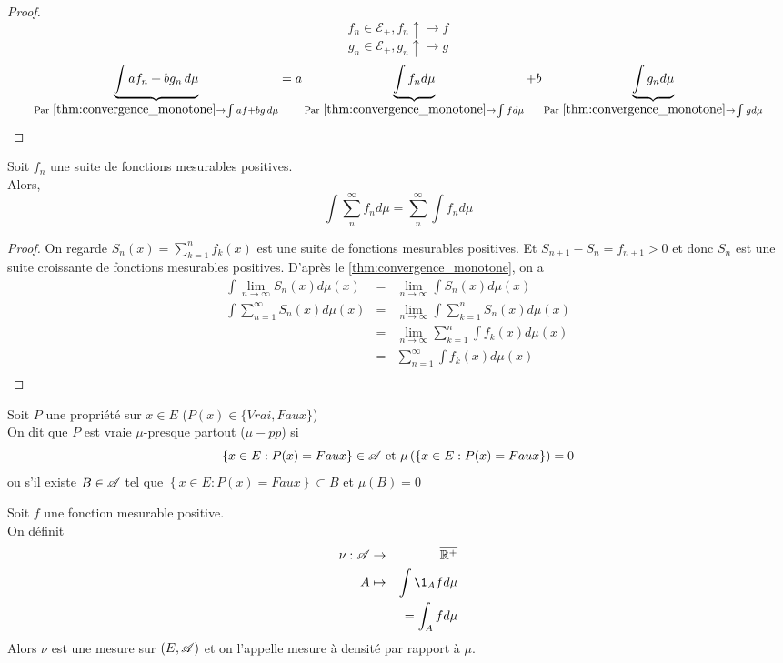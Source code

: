 \begin{proof}
	$$f_n \in \mathcal{E}_+, f_n \uparrow \to f$$
	$$ g_n \in \mathcal{E}_+, g_n \uparrow \to g$$
	$$ \underbrace{\int a f_n + b g_n \,d\mu}_{\text{Par } \ref{thm:convergence_monotone} \to \int a f + b g\,d\mu}
		= a \underbrace{\int f_n d\mu}_{ \text{Par } \ref{thm:convergence_monotone} \to \int f d\mu}
		+ b \underbrace{\int g_n d\mu}_{ \text{Par } \ref{thm:convergence_monotone} \to \int g d\mu} $$
\end{proof}



\begin{prop} 
	Soit $f_n$ une suite de fonctions mesurables positives.\\
	Alors,
	$$ \int \sum\limits_n^{\infty} f_n d\mu = \sum\limits_n^{\infty} \int f_n d\mu $$
\end{prop}

\begin{proof}
	On regarde $S_n(x) = \sum\limits_{k=1}^n f_k(x)$ est une suite de fonctions mesurables positives.
	Et $S_{n+1} - S_n = f_{n+1} > 0 $ et donc $S_n$ est une suite croissante de fonctions mesurables positives.
	D'après le \ref{thm:convergence_monotone}, on a
	\begin{eqnarray*}
		\int \lim\limits_{n \to \infty} S_n (x)d\mu (x)&=& \lim\limits_{n \to \infty} \int S_n(x) d\mu(x) \\
		\int \sum\limits_{n = 1}^{\infty} S_n (x)d\mu (x)&=& \lim\limits_{n \to \infty} \int \sum\limits_{k = 1}^n S_n(x) d\mu(x) \\
		&=& \lim\limits_{n \to \infty} \sum\limits_{k = 1}^n\int  f_k(x) d\mu(x) \\
		&=& \sum\limits_{n = 1}^{\infty} \int  f_k(x) d\mu(x) \\
	\end{eqnarray*}
\end{proof}


\begin{definition}
	Soit $P$ une propriété sur $x \in E$ ($P(x) \in \{Vrai, Faux\}$)\\
	On dit que $P$ est vraie $\mu$-presque partout ($\mu-pp$) si
	$$ \left\{x \in E : P(x)  = Faux \right\} \in \mathscr{A} \text{ et } \mu\left(\left\{x \in E : P(x)  = Faux \right\}\right) = 0 $$
	ou s'il existe $B \in \mathscr{A}$ tel que $\left\{ x \in E : P(x) = Faux \right\} \subset B$ et $\mu(B) = 0$
\end{definition}

\begin{definition}
	Soit $f$ une fonction mesurable positive. \\
	On définit
	\begin{eqnarray*}
		\nu : \triA & \to &\Rbarp                  \\
		A     & \mapsto & \int \1_A f d\mu \\
		&& = \int_A fd\mu
	\end{eqnarray*}
	Alors $\nu$ est une mesure sur $(E, \mathscr{A})$ et on l'appelle mesure à densité par rapport à $\mu$.
\end{definition}


